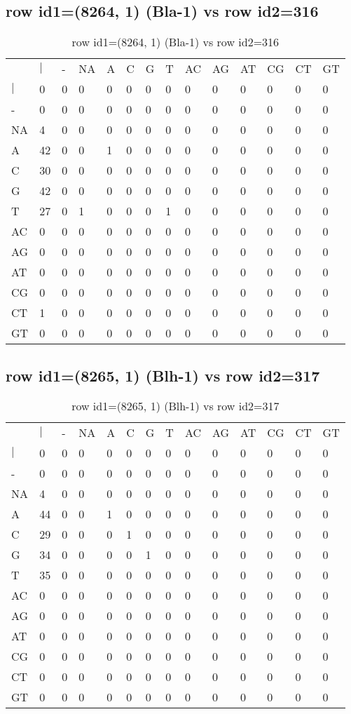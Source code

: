 \subsection{row id1=(8264, 1) (Bla-1) vs row id2=316}
\begin{center}
\begin{longtable}{|l|l|l|l|l|l|l|l|l|l|l|l|l|l|}
\caption{row id1=(8264, 1) (Bla-1) vs row id2=316} \label{table_dm214}\\
\hline
\\
\hline
&$|$&-&NA&A&C&G&T&AC&AG&AT&CG&CT&GT\\
$|$&0&0&0&0&0&0&0&0&0&0&0&0&0\\
-&0&0&0&0&0&0&0&0&0&0&0&0&0\\
NA&4&0&0&0&0&0&0&0&0&0&0&0&0\\
A&42&0&0&1&0&0&0&0&0&0&0&0&0\\
C&30&0&0&0&0&0&0&0&0&0&0&0&0\\
G&42&0&0&0&0&0&0&0&0&0&0&0&0\\
T&27&0&1&0&0&0&1&0&0&0&0&0&0\\
AC&0&0&0&0&0&0&0&0&0&0&0&0&0\\
AG&0&0&0&0&0&0&0&0&0&0&0&0&0\\
AT&0&0&0&0&0&0&0&0&0&0&0&0&0\\
CG&0&0&0&0&0&0&0&0&0&0&0&0&0\\
CT&1&0&0&0&0&0&0&0&0&0&0&0&0\\
GT&0&0&0&0&0&0&0&0&0&0&0&0&0\\
\hline
\end{longtable}
\end{center}

\subsection{row id1=(8265, 1) (Blh-1) vs row id2=317}
\begin{center}
\begin{longtable}{|l|l|l|l|l|l|l|l|l|l|l|l|l|l|}
\caption{row id1=(8265, 1) (Blh-1) vs row id2=317} \label{table_dm216}\\
\hline
\\
\hline
&$|$&-&NA&A&C&G&T&AC&AG&AT&CG&CT&GT\\
$|$&0&0&0&0&0&0&0&0&0&0&0&0&0\\
-&0&0&0&0&0&0&0&0&0&0&0&0&0\\
NA&4&0&0&0&0&0&0&0&0&0&0&0&0\\
A&44&0&0&1&0&0&0&0&0&0&0&0&0\\
C&29&0&0&0&1&0&0&0&0&0&0&0&0\\
G&34&0&0&0&0&1&0&0&0&0&0&0&0\\
T&35&0&0&0&0&0&0&0&0&0&0&0&0\\
AC&0&0&0&0&0&0&0&0&0&0&0&0&0\\
AG&0&0&0&0&0&0&0&0&0&0&0&0&0\\
AT&0&0&0&0&0&0&0&0&0&0&0&0&0\\
CG&0&0&0&0&0&0&0&0&0&0&0&0&0\\
CT&0&0&0&0&0&0&0&0&0&0&0&0&0\\
GT&0&0&0&0&0&0&0&0&0&0&0&0&0\\
\hline
\end{longtable}
\end{center}

